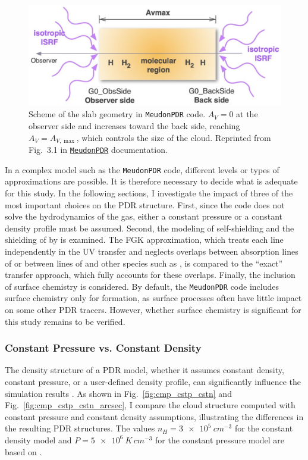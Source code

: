 \documentclass[12pt,a4paper]{article}
\newcommand{\mdpdr}{\texttt{MeudonPDR} code}
\begin{document}
\begin{figure}
    \centering
    \includegraphics[width=.7\textwidth,keepaspectratio]{schemePDR.pdf}
    \caption{Scheme of the slab geometry in \mdpdr{}. $A_V = 0$ at the observer side and increases toward the back side, reaching $A_V = A_{V, \max}$, which controls the size of the cloud. Reprinted from Fig.~3.1 in \href{https://ism.obspm.fr/files/PDRDocumentation/PDRDoc7.pdf}{\texttt{MeudonPDR}} documentation.} \label{fig:1Dgeometry}
\end{figure}

In a complex model such as the \mdpdr{}, different levels or types of approximations are possible. It is therefore necessary to decide what is adequate for this study. In the following sections, I investigate the impact of three of the most important choices on the PDR structure. First, since the code does not solve the hydrodynamics of the gas, either a constant pressure or a constant density profile must be assumed. Second, the modeling of  self-shielding and the shielding of  by  is examined. The FGK approximation, which treats each line independently in the UV transfer and neglects overlaps between absorption lines of  or between lines of  and other species such as , is compared to the “exact” transfer approach, which fully accounts for these overlaps. Finally, the inclusion of surface chemistry is considered. By default, the \mdpdr{} includes surface chemistry only for  formation, as surface processes often have little impact on some other PDR tracers. However, whether surface chemistry is significant for this study remains to be verified.

\subsubsection{Constant Pressure vs. Constant Density} \label{sec:cstnp}

The density structure of a PDR model, whether it assumes constant density, constant pressure, or a user-defined density profile, can significantly influence the simulation results \parencite{Wolfire2022}. As shown in Fig.~\ref{fig:cmp_cstp_cstn} and Fig.~\ref{fig:cmp_cstp_cstn_arcsec}, I compare the cloud structure computed with constant pressure and constant density assumptions, illustrating the differences in the resulting PDR structures. The values $n_H = \qty{3e5}{cm^{-3}}$ for the constant density model and $P = \qty{5e6}{K\,cm^{-3}}$ for the constant pressure model are based on \textcite{Maillard2023}. 
\end{document}
